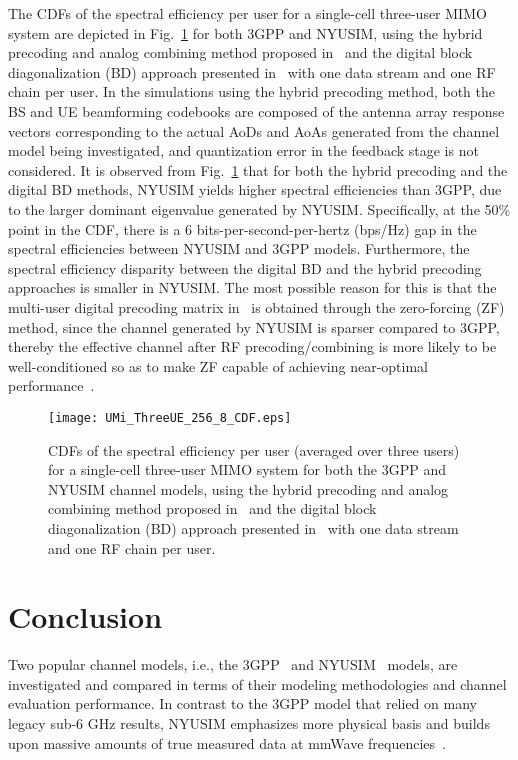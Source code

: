 \documentclass[journal]{IEEEtran}
\begin{document}
The CDFs of the spectral efficiency per user for a single-cell three-user MIMO system are depicted in Fig.~\ref{fig:SE} for both 3GPP and NYUSIM, using the hybrid precoding and analog combining method proposed in~\cite{Alk15} and the digital block diagonalization (BD) approach presented in~\cite{Spencer04} with one data stream and one RF chain per user. In the simulations using the hybrid precoding method, both the BS and UE beamforming codebooks are composed of the antenna array response vectors corresponding to the actual AoDs and AoAs generated from the channel model being investigated, and quantization error in the feedback stage is not considered. It is observed from Fig.~\ref{fig:SE} that for both the hybrid precoding and the digital BD methods, NYUSIM yields higher spectral efficiencies than 3GPP, due to the larger dominant eigenvalue generated by NYUSIM. Specifically, at the 50\% point in the CDF, there is a 6 bits-per-second-per-hertz (bps/Hz) gap in the spectral efficiencies between NYUSIM and 3GPP models. Furthermore, the spectral efficiency disparity between the digital BD and the hybrid precoding approaches is smaller in NYUSIM. The most possible reason for this is that the multi-user digital precoding matrix in~\cite{Alk15} is obtained through the zero-forcing (ZF) method, since the channel generated by NYUSIM is sparser compared to 3GPP, thereby the effective channel after RF precoding/combining is more likely to be well-conditioned so as to make ZF capable of achieving near-optimal performance~\cite{Yoo06,Alk15}. 

\begin{figure}
	\centering
	\texttt{[image: UMi\_ThreeUE\_256\_8\_CDF.eps]}
	\caption{CDFs of the spectral efficiency per user (averaged over three users) for a single-cell three-user MIMO system for both the 3GPP and NYUSIM channel models, using the hybrid precoding and analog combining method proposed in~\cite{Alk15} and the digital block diagonalization (BD) approach presented in~\cite{Spencer04} with one data stream and one RF chain per user.}
	\label{fig:SE}
\end{figure}

\section{Conclusion}
Two popular channel models, i.e., the 3GPP~\cite{3GPP_Dec} and NYUSIM~\cite{Sun17_NYUSIM,Samimi15:MTT} models, are investigated and compared in terms of their modeling methodologies and channel evaluation performance. In contrast to the 3GPP model that relied on many legacy sub-6 GHz results, NYUSIM emphasizes more physical basis and builds upon massive amounts of true measured data at mmWave frequencies~\cite{Rap13:Access,Rap15:TCOM,Samimi16_Local,Samimi15:MTT,Samimi15_Pro,Sun17_NYUSIM,Tho16,Rap_5GTech}.
\end{document}
